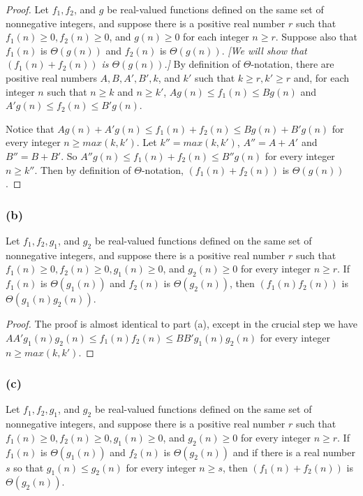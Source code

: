 \documentclass[14pt]{extarticle}
\begin{document}
\begin{proof}
Let \(f_1, f_2\), and \(g\) be real-valued functions defined on the same set of nonnegative integers, and suppose there is 
a positive real number \(r\) such that \(f_1(n) \geq 0, f_2(n) \geq 0\), and \(g(n) \geq 0\) for each integer \(n \geq r\). 
Suppose also that \(f_1(n)\) is \(\Theta(g(n))\) and \(f_2(n)\) is \(\Theta(g(n))\). {\it [We will show that \((f_1(n) + 
f_2(n))\) is \(\Theta(g(n))\).]} By definition of \(\Theta\)-notation, there are positive real numbers \(A, B, A', B', k\), 
and \(k'\) such that \(k \geq r, k' \geq r\) and, for each integer \(n\) such that \(n \geq k\) and \(n \geq k'\), 
\(Ag(n) \leq f_1(n) \leq Bg(n)\) and \(A'g(n) \leq f_2(n) \leq B'g(n)\). 

Notice that \(Ag(n) + A'g(n) \leq f_1(n) + f_2(n) \leq Bg(n) + B'g(n)\) for every integer \(n \geq max(k, k')\). Let 
\(k'' = max(k, k')\), \(A'' = A + A'\) and \(B'' = B + B'\). So \(A''g(n) \leq f_1(n) + f_2(n) \leq B''g(n)\) for every 
integer \(n \geq k''\). Then by definition of \(\Theta\)-notation, \((f_1(n) + f_2(n))\) is \(\Theta(g(n))\).
\end{proof}

\subsubsection{(b)}
Let \(f_1, f_2, g_1\), and \(g_2\) be real-valued functions defined on the same set of nonnegative integers, and suppose 
there is a positive real number \(r\) such that \(f_1(n) \geq 0, f_2(n) \geq 0, g_1(n) \geq 0\), and \(g_2(n) \geq 0\) for 
every integer \(n \geq r\). If \(f_1(n)\) is \(\Theta(g_1(n))\) and \(f_2(n)\) is \(\Theta(g_2(n))\), then 
\((f_1(n)f_2(n))\) is \(\Theta(g_1(n)g_2(n))\).

\begin{proof}
The proof is almost identical to part (a), except in the crucial step we have \(AA'g_1(n)g_2(n) \leq f_1(n)f_2(n) \leq 
BB'g_1(n)g_2(n)\) for every integer \(n \geq max(k, k')\).
\end{proof}

\subsubsection{(c)}
Let \(f_1, f_2, g_1\), and \(g_2\) be real-valued functions defined on the same set of nonnegative integers, and suppose 
there is a positive real number \(r\) such that \(f_1(n) \geq 0, f_2(n) \geq 0, g_1(n) \geq 0\), and \(g_2(n) \geq 0\) for 
every integer \(n \geq r\). If \(f_1(n)\) is \(\Theta(g_1(n))\) and \(f_2(n)\) is \(\Theta(g_2(n))\) and if there is a real 
number \(s\) so that \(g_1(n) \leq g_2(n)\) for every integer \(n \geq s\), then \((f_1(n)+f_2(n))\) is \(\Theta(g_2(n))\).
\end{document}

